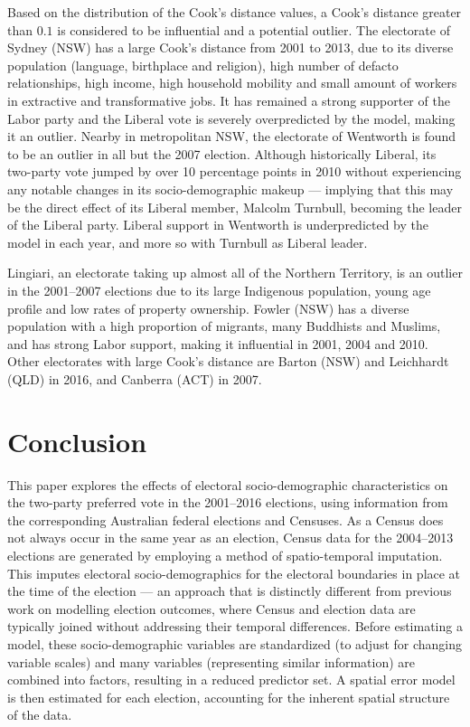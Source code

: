 \documentclass[times, doublespace]{anzsauth}
\begin{document}
Based on the distribution of the Cook's distance values, a Cook's distance greater than \(0.1\) is considered to be influential and a potential outlier. The electorate of Sydney (NSW) has a large Cook's distance from 2001 to 2013, due to its diverse population (language, birthplace and religion), high number of defacto relationships, high income, high household mobility and small amount of workers in extractive and transformative jobs. It has remained a strong supporter of the Labor party and the Liberal vote is severely overpredicted by the model, making it an outlier. Nearby in metropolitan NSW, the electorate of Wentworth is found to be an outlier in all but the 2007 election. Although historically Liberal, its two-party vote jumped by over 10 percentage points in 2010 without experiencing any notable changes in its socio-demographic makeup --- implying that this may be the direct effect of its Liberal member, Malcolm Turnbull, becoming the leader of the Liberal party. Liberal support in Wentworth is underpredicted by the model in each year, and more so with Turnbull as Liberal leader.

Lingiari, an electorate taking up almost all of the Northern Territory, is an outlier in the 2001--2007 elections due to its large Indigenous population, young age profile and low rates of property ownership. Fowler (NSW) has a diverse population with a high proportion of migrants, many Buddhists and Muslims, and has strong Labor support, making it influential in 2001, 2004 and 2010. Other electorates with large Cook's distance are Barton (NSW) and Leichhardt (QLD) in 2016, and Canberra (ACT) in 2007.

\hypertarget{conclusion}{%
\section{Conclusion}\label{conclusion}}

This paper explores the effects of electoral socio-demographic characteristics on the two-party preferred vote in the 2001--2016 elections, using information from the corresponding Australian federal elections and Censuses. As a Census does not always occur in the same year as an election, Census data for the 2004--2013 elections are generated by employing a method of spatio-temporal imputation. This imputes electoral socio-demographics for the electoral boundaries in place at the time of the election --- an approach that is distinctly different from previous work on modelling election outcomes, where Census and election data are typically joined without addressing their temporal differences. Before estimating a model, these socio-demographic variables are standardized (to adjust for changing variable scales) and many variables (representing similar information) are combined into factors, resulting in a reduced predictor set. A spatial error model is then estimated for each election, accounting for the inherent spatial structure of the data.
\end{document}

